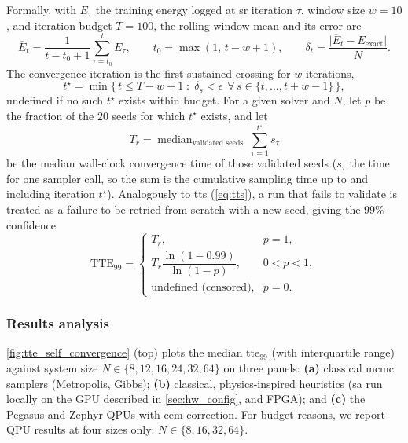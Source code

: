 \documentclass[10pt,a4paper]{article}
\numberwithin{equation}{section}
\begin{document}
Formally, with $E_\tau$ the training energy logged at \gls{sr} iteration $\tau$, window size $w=10$, and iteration budget $T=100$, the rolling-window mean and its error are
\begin{equation}
\label{eq:tte-window}
\overline{E}_t = \frac{1}{t - t_0 + 1}\sum_{\tau=t_0}^{t} E_\tau, \qquad t_0 = \max(1,\, t-w+1), \qquad
\delta_t = \frac{\big|\overline{E}_t - E_\mathrm{exact}\big|}{N}.
\end{equation}
The convergence iteration is the first sustained crossing for $w$ iterations,
\begin{equation}
\label{eq:tte-conv}
t^\star = \min\Big\{\, t \le T-w+1 \;:\; \delta_s < \epsilon \ \ \forall\, s \in \{t,\dots,t+w-1\} \,\Big\},
\end{equation}
undefined if no such $t^\star$ exists within budget. For a given solver and $N$, let $p$ be the fraction of the $20$ seeds for which $t^\star$ exists, and let
\begin{equation}
\label{eq:tte-Tr}
T_r = \operatorname{median}_{\text{validated seeds}} \ \sum_{\tau=1}^{t^\star} s_\tau
\end{equation}
be the median wall-clock convergence time of those validated seeds ($s_\tau$ the time for one sampler call, so the sum is the cumulative sampling time up to and including iteration $t^\star$). Analogously to \gls{tts} (\autoref{eq:tts}), a run that fails to validate is treated as a failure to be retried from scratch with a new seed, giving the $99\%$-confidence
\begin{equation}
\label{eq:tte99}
\mathrm{TTE}_{99} =
\begin{cases}
T_r, & p = 1, \\[2pt]
T_r \dfrac{\ln(1-0.99)}{\ln(1-p)}, & 0 < p < 1, \\[4pt]
\text{undefined (censored)}, & p = 0.
\end{cases}
\end{equation}

\subsubsection{Results analysis}
\autoref{fig:tte_self_convergence} (top) plots the median \gls{tte}$_{99}$ (with interquartile range) against system size $N\in\{8,12,16,24,32,64\}$ on three panels: \textbf{(a)} classical \gls{mcmc} samplers (Metropolis, Gibbs); \textbf{(b)} classical, physics-inspired heuristics (\gls{sa} run locally on the GPU described in \autoref{sec:hw_config}, and FPGA); and \textbf{(c)} the Pegasus and Zephyr QPUs with \gls{cem} correction. For budget reasons, we report QPU results at four sizes only: $N\in\{8,16,32,64\}$. 
\end{document}
